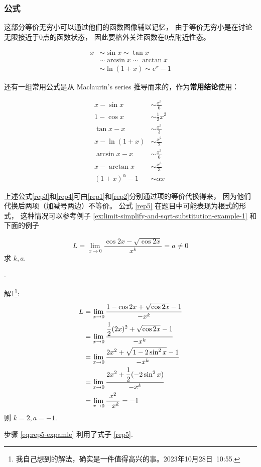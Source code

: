 \subsubsection{公式}
这部分等价无穷小可以通过他们的函数图像辅以记忆，
由于等价无穷小是在讨论无限接近于0点的函数状态，
因此要格外关注函数在0点附近性态。
\begin{lemma}[等价无穷小]
	\begin{align}
		x&\sim\sin{x}\sim\tan{x} \\ 
		&\sim\arcsin{x}\sim\arctan{x} \\
		&\sim\ln{(1+x)}\sim e^x-1
	\end{align}
\end{lemma}

还有一组常用公式是从 Maclaurin's series 推导而来的，作为\textbf{常用结论}使用：
\begin{lemma}[等价无穷小]
	\begin{align}
		x - \sin{x}     &\sim \frac{x^3}{6} \label{rep1} \\
        1 - \cos{x}     &\sim \frac{1}{2} x^2 \\
		\tan{x} - x     &\sim \frac{x^3}{3} \label{rep2} \\
		x - \ln{(1+x)}  &\sim \frac{x^2}{2} \\
		\arcsin{x} - x  &\sim \frac{x^3}{6} \label{rep3}\\
		x - \arctan{x}  &\sim \frac{x^3}{3} \label{rep4}\\
        (1+x)^\alpha-1  &\sim \alpha x \label{rep5}
	\end{align}
\end{lemma}
上述公式\eqref{rep3}和\eqref{rep4}可由\eqref{rep1}和\eqref{rep2}分别通过项的等价代换得来，
因为他们代换后两项（加减号两边）不等价。
公式 \ref{rep5} 在题目中可能表现为根式的形式，
这种情况可以参考例子
\ref{ex:limit-simplify-and-sqrt-substitution-example-1}
和下面的例子

\begin{example}
    \label{ex:sqrt-substitution-example-2}
    \[
        L = \lim_{x \to 0} \dfrac{\cos 2x - \sqrt{\cos 2x}}{x^k} = a \neq 0
    \]
    求 $k, a$.

    \cite[question 131]{w660}.

    解1\footnote{我自己想到的解法，确实是一件值得高兴的事。2023年10月28日\, 10:55.}:
    \begin{align}
        L &= \lim_{x \to 0} \dfrac{ 1- \cos 2x + \sqrt{\cos 2x} -1 }{-x^k} \notag \\
          &= \lim_{x \to 0} \dfrac{ \dfrac{1}{2} (2x)^2 + \sqrt{\cos 2x} - 1 }{-x^k} \notag \\ 
          &= \lim_{x \to 0} \dfrac{ 2x^2 + \sqrt{1 - 2\sin^2 x } - 1 }{-x^k} \label{eq:rep5-expamle} \\
          &= \lim_{x \to 0} \dfrac{ 2x^2 + \dfrac{1}{2} (-2 \sin^2 x) }{-x^k} \notag \\
          &= \lim_{x \to 0} \dfrac{ x^2 }{-x^k} = -1 \notag
    \end{align}
    则 $k = 2, a = -1$.

    步骤 \ref{eq:rep5-expamle} 利用了式子 \ref{rep5}.
\end{example}

